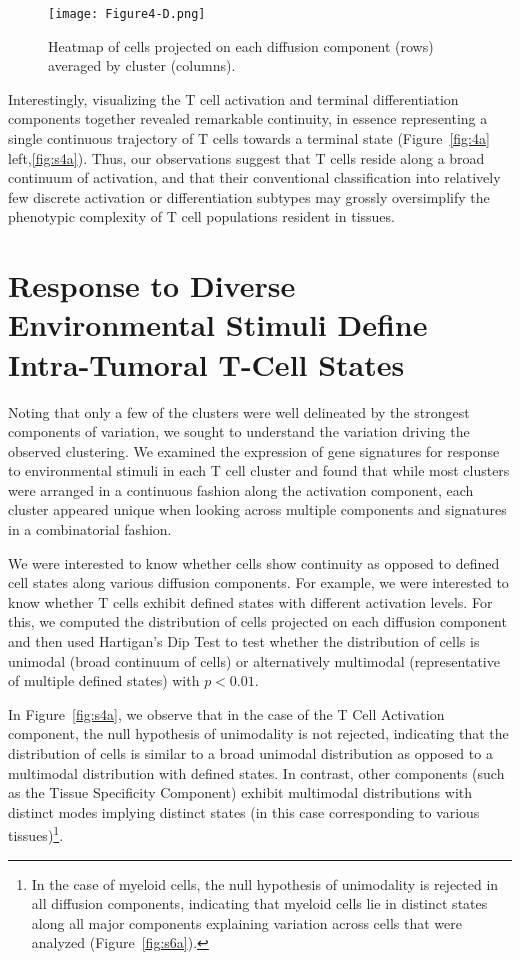 \begin{figure}
\centering
\texttt{[image: Figure4-D.png]}
\caption{Heatmap of cells projected on each diffusion component (rows) averaged by cluster (columns).
}
\label{fig:4d}
\end{figure}

Interestingly, visualizing the T cell activation and terminal differentiation components together revealed remarkable continuity, in essence representing a single continuous trajectory of T cells towards a terminal state (Figure~\ref{fig:4a} left,\ref{fig:s4a}).
Thus, our observations suggest that T cells reside along a broad continuum of activation, and that their conventional classification into relatively few discrete activation or differentiation subtypes may grossly oversimplify the phenotypic complexity of T cell populations resident in tissues.

\section{Response to Diverse Environmental Stimuli Define Intra-Tumoral T-Cell States}

Noting that only a few of the clusters were well delineated by the strongest components of variation, we sought to understand the variation driving the observed clustering.
We examined the expression of gene signatures for response to environmental stimuli in each T cell cluster and found that while most clusters were arranged in a continuous fashion along the activation component, each cluster appeared unique when looking across multiple components and signatures in a combinatorial fashion. 

We were interested to know whether cells show continuity as opposed to defined cell states along various diffusion components.
For example, we were interested to know whether T cells exhibit defined states with different activation levels.
For this, we computed the distribution of cells projected on each diffusion component and then used Hartigan's Dip Test \citep{Hartigan1985} to test whether the distribution of cells is unimodal (broad continuum of cells) or alternatively multimodal (representative of multiple defined states) with $p<0.01$.

In Figure~\ref{fig:s4a}, we observe that in the case of the T Cell Activation component, the null hypothesis of unimodality is not rejected, indicating that the distribution of cells is similar to a broad unimodal distribution as opposed to a multimodal distribution with defined states. 
In contrast, other components (such as the Tissue Specificity Component) exhibit multimodal distributions with distinct modes implying distinct states (in this case corresponding to various tissues)\footnote{In the case of myeloid cells, the null hypothesis of unimodality is rejected in all diffusion components, indicating that myeloid cells lie in distinct states along all major components explaining variation across cells that were analyzed (Figure~\ref{fig:s6a}).}.

